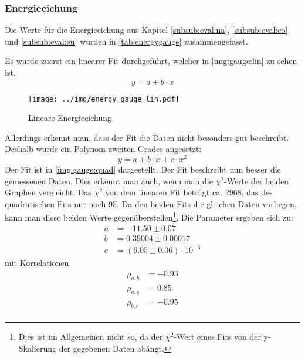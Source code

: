 \subsubsection{Energieeichung}
Die Werte für die Energieeichung aus Kapitel \ref{subsub:eval:na}, \ref{subsub:eval:co} und \ref{subsub:eval:eu} wurden in 
\autoref{tab:energygauge} zusammengefasst.

Es wurde zuerst ein linearer Fit durchgeführt, welcher in \autoref{img:gauge:lin} zu sehen ist.
\begin{equation}
  y = a + b\cdot x
\end{equation}
\label{subsub:energygauge}
\begin{figure}[H]
\begin{center}
  \texttt{[image: ../img/energy\_gauge\_lin.pdf]}
  \caption{Lineare Energieeichung}
  \label{img:gauge:lin}
\end{center}
\end{figure}
Allerdings erkennt man, dass der Fit die Daten nicht besonders gut beschreibt. Deshalb wurde ein Polynom zweiten Grades angesetzt:
\begin{equation}
  y = a + b\cdot x + c\cdot x^2
\end{equation}
Der Fit ist in \autoref{img:gauge:quad} dargestellt. Der Fit beschreibt nun besser die gemessenen Daten. Dies erkennt man auch, 
wenn man die $\chi^2$-Werte der beiden Graphen vergleicht. Das $\chi^2$ von dem linearen Fit beträgt ca. 2968, das des quadratischen Fits 
nur noch 95. Da den beiden Fits die gleichen Daten vorliegen, kann man diese beiden Werte gegenüberstellen\footnote{Dies ist im Allgemeinen nicht so,
da der $\chi^2$-Wert eines Fits von der y-Skalierung der gegebenen Daten abängt.}.
Die Parameter ergeben sich zu:
\begin{equation}
\begin{split}
  \label{eq:energygauge:params}
  a &= -11.50 \pm 0.07 \\
  b &= 0.39004 \pm 0.00017 \\
  c &= (6.05 \pm 0.06) \cdot 10^{-6}
\end{split}
\end{equation}
mit Korrelationen
\begin{equation}
\begin{split}
  \label{eq:energygauge:corr}
  \rho_{a, b} &= -0.93 \\
  \rho_{a, c} &=  0.85 \\
  \rho_{b, c} &= -0.95 \\
\end{split}
\end{equation}
